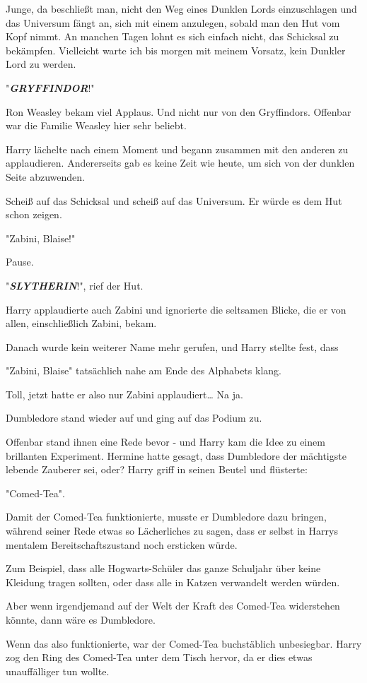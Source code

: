 {Junge, da beschließt man, nicht den Weg eines Dunklen Lords einzuschlagen und das Universum fängt an, sich mit einem anzulegen, sobald man den Hut vom Kopf nimmt. An manchen Tagen lohnt es sich einfach nicht, das Schicksal zu bekämpfen. Vielleicht warte ich bis morgen mit meinem Vorsatz, kein Dunkler Lord zu werden.

"\textbf{\emph{GRYFFINDOR}}!"

Ron Weasley bekam viel Applaus. Und nicht nur von den Gryffindors. Offenbar war die Familie Weasley hier sehr beliebt.

Harry lächelte nach einem Moment und begann zusammen mit den anderen zu applaudieren. Andererseits gab es keine Zeit wie heute, um sich von der dunklen Seite abzuwenden.

Scheiß auf das Schicksal und scheiß auf das Universum. Er würde es dem Hut schon zeigen.

"Zabini, Blaise!"

Pause.

"\textbf{\emph{SLYTHERIN}}!", rief der Hut.

Harry applaudierte auch Zabini und ignorierte die seltsamen Blicke, die er von allen, einschließlich Zabini, bekam.

Danach wurde kein weiterer Name mehr gerufen, und Harry stellte fest, dass

"Zabini, Blaise" tatsächlich nahe am Ende des Alphabets klang.

Toll, jetzt hatte er also nur Zabini applaudiert… Na ja.

Dumbledore stand wieder auf und ging auf das Podium zu.

Offenbar stand ihnen eine Rede bevor - und Harry kam die Idee zu einem brillanten Experiment. Hermine hatte gesagt, dass Dumbledore der mächtigste lebende Zauberer sei, oder? Harry griff in seinen Beutel und flüsterte:

"Comed-Tea".

Damit der Comed-Tea funktionierte, musste er Dumbledore dazu bringen, während seiner Rede etwas so Lächerliches zu sagen, dass er selbst in Harrys mentalem Bereitschaftszustand noch ersticken würde.

Zum Beispiel, dass alle Hogwarts-Schüler das ganze Schuljahr über keine Kleidung tragen sollten, oder dass alle in Katzen verwandelt werden würden.

Aber wenn irgendjemand auf der Welt der Kraft des Comed-Tea widerstehen könnte, dann wäre es Dumbledore.

Wenn das also funktionierte, war der Comed-Tea buchstäblich unbesiegbar. Harry zog den Ring des Comed-Tea unter dem Tisch hervor, da er dies etwas unauffälliger tun wollte.

}

